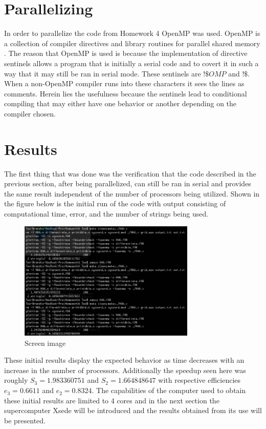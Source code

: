 \documentclass[12pt]{article}
\theoremstyle{definition}
\theoremstyle{definition}
\begin{document}
\section{Parallelizing}
In order to parallelize the code from Homework 4 OpenMP was used. OpenMP is a collection of compiler directives and library routines for parallel shared memory \cite{HW}. The reason that OpenMP is used is because the implementation of directive sentinels allows a program that is initially a serial code and to covert it in such a way that it may still be ran in serial mode. These sentinels are \(!\$OMP\) and \(!\$\). When a non-OpenMP compiler runs into these characters it sees the lines as comments. Herein lies the usefulness because the sentinels lead to conditional compiling that may either have one behavior or another depending on the compiler chosen.

\section{Results}
The first thing that was done was the verification that the code described in the previous section, after being parallelized, can still be ran in serial and provides the same result independent of the number of processors being utilized. Shown in the figure below is the initial run of the code with output consisting of computational time, error, and the number of strings being used.
\begin{figure}[h]
\caption{Screen image}
\centering
\includegraphics[width=0.75\textwidth]{initialresults}
\end{figure}
\newpage
These initial results display the expected behavior as time decreases with an increase in the number of processors. Additionally the speedup seen here was roughly \(S_{3}=1.983360751\) and \(S_{2}=1.664848647\) with respective efficiencies \(e_{3}=0.6611\) and \(e_{2}=0.8324\). The capabilities of the computer used to obtain these initial results are limited to 4 cores and in the next section the supercomputer Xsede will be introduced and the results obtained from its use will be presented.
\end{document}

